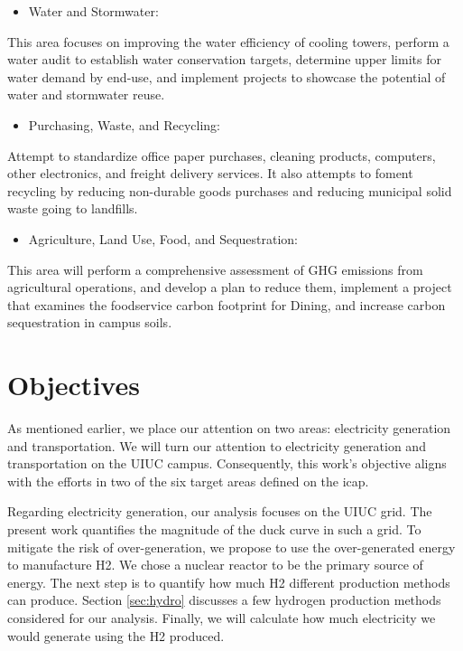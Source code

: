 \begin{itemize}
	\item Water and Stormwater:
\end{itemize}
This area focuses on improving the water efficiency of cooling towers, perform a water audit to establish water conservation targets, determine upper limits for water demand by end-use, and implement projects to showcase the potential of water and stormwater reuse.

\begin{itemize}
	\item Purchasing, Waste, and Recycling:
\end{itemize}
Attempt to standardize office paper purchases, cleaning products, computers, other electronics, and freight delivery services.
It also attempts to foment recycling by reducing non-durable goods purchases and reducing municipal solid waste going to landfills.

\begin{itemize}
	\item Agriculture, Land Use, Food, and Sequestration:
\end{itemize}
This area will perform a comprehensive assessment of \gls{GHG} emissions from agricultural operations, and develop a plan to reduce them, implement a project that examines the foodservice carbon footprint for Dining, and increase carbon sequestration in campus soils.

\section{Objectives}

As mentioned earlier, we place our attention on two areas: electricity generation and transportation.
We will turn our attention to electricity generation and transportation on the \gls{UIUC} campus.
Consequently, this work's objective aligns with the efforts in two of the six target areas defined on the \gls{icap}.

Regarding electricity generation, our analysis focuses on the \gls{UIUC} grid.
The present work quantifies the magnitude of the duck curve in such a grid.
To mitigate the risk of over-generation, we propose to use the over-generated energy to manufacture \gls{H2}.
We chose a nuclear reactor to be the primary source of energy.
The next step is to quantify how much \gls{H2} different production methods can produce.
Section \ref{sec:hydro} discusses a few hydrogen production methods considered for our analysis.
Finally, we will calculate how much electricity we would generate using the \gls{H2} produced.

